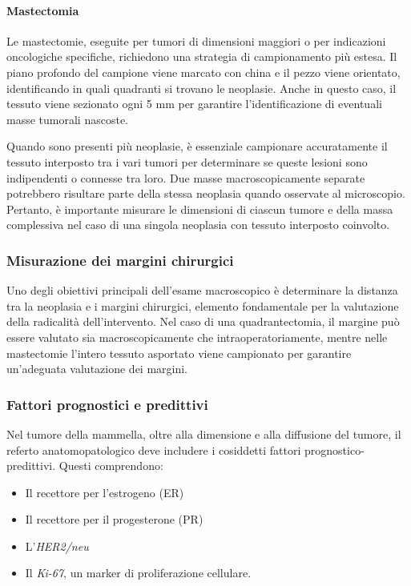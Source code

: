 \paragraph{Mastectomia}
Le mastectomie, eseguite per tumori di dimensioni maggiori o per indicazioni oncologiche specifiche, richiedono una strategia di campionamento più estesa. Il piano profondo del campione viene marcato con china e il pezzo viene orientato, identificando in quali quadranti si trovano le neoplasie. Anche in questo caso, il tessuto viene sezionato ogni 5 mm per garantire l’identificazione di eventuali masse tumorali nascoste.

Quando sono presenti più neoplasie, è essenziale campionare accuratamente il tessuto interposto tra i vari tumori per determinare se queste lesioni sono indipendenti o connesse tra loro. Due masse macroscopicamente separate potrebbero risultare parte della stessa neoplasia quando osservate al microscopio. Pertanto, è importante misurare le dimensioni di ciascun tumore e della massa complessiva nel caso di una singola neoplasia con tessuto interposto coinvolto.

\subsubsection{Misurazione dei margini chirurgici}
Uno degli obiettivi principali dell’esame macroscopico è determinare la distanza tra la neoplasia e i margini chirurgici, elemento fondamentale per la valutazione della radicalità dell’intervento. Nel caso di una quadrantectomia, il margine può essere valutato sia macroscopicamente che intraoperatoriamente, mentre nelle mastectomie l’intero tessuto asportato viene campionato per garantire un’adeguata valutazione dei margini.

\subsubsection{Fattori prognostici e predittivi}
Nel tumore della mammella, oltre alla dimensione e alla diffusione del tumore, il referto anatomopatologico deve includere i cosiddetti fattori prognostico-predittivi. Questi comprendono:
\begin{itemize}
    \item Il recettore per l'estrogeno (ER)
    \item Il recettore per il progesterone (PR)
    \item L’\textit{HER2/neu}
    \item Il \textit{Ki-67}, un marker di proliferazione cellulare.
\end{itemize}

